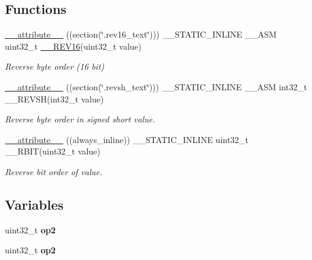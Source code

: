 \subsection*{Functions}
\begin{DoxyCompactItemize}
\item 
\mbox{\hyperlink{group___c_m_s_i_s___core___instruction_interface_gae84a2733711339c5eefeb0d899506b96}{\+\_\+\+\_\+attribute\+\_\+\+\_\+}} ((section(\char`\"{}.rev16\+\_\+text\char`\"{}))) \+\_\+\+\_\+\+S\+T\+A\+T\+I\+C\+\_\+\+I\+N\+L\+I\+NE \+\_\+\+\_\+\+A\+SM uint32\+\_\+t \mbox{\hyperlink{group___c_m_s_i_s___core___instruction_interface_ga4e3acd41e7667cdf65ffcd8c76a8613f}{\+\_\+\+\_\+\+R\+E\+V16}}(uint32\+\_\+t value)
\begin{DoxyCompactList}\small\item\em Reverse byte order (16 bit) \end{DoxyCompactList}\item 
\mbox{\hyperlink{group___c_m_s_i_s___core___instruction_interface_ga8e7a866927d3257a82b884ad14dbef4c}{\+\_\+\+\_\+attribute\+\_\+\+\_\+}} ((section(\char`\"{}.revsh\+\_\+text\char`\"{}))) \+\_\+\+\_\+\+S\+T\+A\+T\+I\+C\+\_\+\+I\+N\+L\+I\+NE \+\_\+\+\_\+\+A\+SM int32\+\_\+t \+\_\+\+\_\+\+R\+E\+V\+SH(int32\+\_\+t value)
\begin{DoxyCompactList}\small\item\em Reverse byte order in signed short value. \end{DoxyCompactList}\item 
\mbox{\hyperlink{group___c_m_s_i_s___core___instruction_interface_gab926fe7178a379c3a7c0410b06fcb661}{\+\_\+\+\_\+attribute\+\_\+\+\_\+}} ((always\+\_\+inline)) \+\_\+\+\_\+\+S\+T\+A\+T\+I\+C\+\_\+\+I\+N\+L\+I\+NE uint32\+\_\+t \+\_\+\+\_\+\+R\+B\+IT(uint32\+\_\+t value)
\begin{DoxyCompactList}\small\item\em Reverse bit order of value. \end{DoxyCompactList}\end{DoxyCompactItemize}
\subsection*{Variables}
\begin{DoxyCompactItemize}
\item 
uint32\+\_\+t {\bfseries op2}
\item 
uint32\+\_\+t {\bfseries op2}
\end{DoxyCompactItemize}


